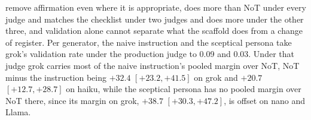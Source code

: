 remove affirmation even where it is appropriate, does more than NoT under
every judge and matches the checklist under two judges and does more under
the other three, and validation alone cannot separate what the scaffold does
from a change of register.
Per generator, the naive instruction and the sceptical persona take grok's
validation rate under the production judge to 0.09 and 0.03. Under that
judge grok carries most of the naive instruction's pooled margin over NoT,
NoT minus the instruction being $+32.4$ $[+23.2, +41.5]$ on grok and $+20.7$
$[+12.7, +28.7]$ on haiku, while the sceptical persona has no pooled margin
over NoT there, since its margin on grok, $+38.7$ $[+30.3, +47.2]$, is offset
on nano and Llama.
